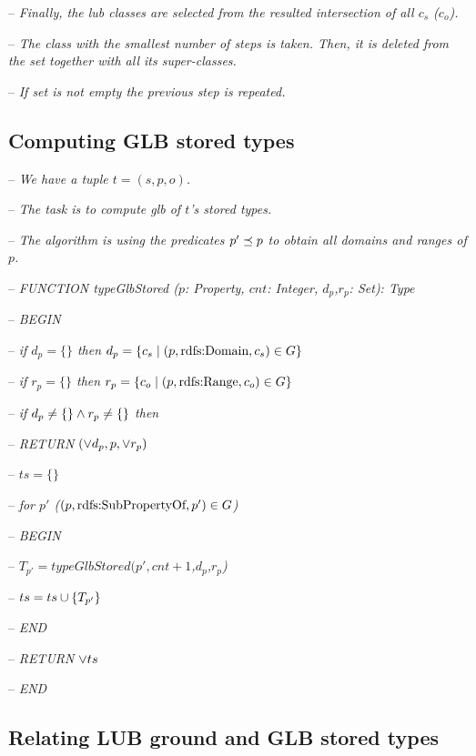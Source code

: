 \documentclass[runningheads]{llncs}
\newcommand{\notes}[1]{\noindent\begin{small}-- \emph{#1}\\\end{small}}
\begin{document}
\notes{Finally, the lub classes are selected from the resulted intersection of all $c_s$ ($c_o$).}
\notes{The class with the smallest number of steps is taken. Then, it is deleted from the set together with all its super-classes.}
\notes{If set is not empty the previous step is repeated.}

\subsection{Computing GLB stored types}


\notes{We have a tuple $t=(s,p,o)$.}
\notes{The task is to compute glb of $t$'s stored types.}
\notes{The algorithm is using the predicates $p'\preceq\/p$ to obtain all domains and ranges of $p$.}



\notes{FUNCTION typeGlbStored ($p$: Property, $cnt$: Integer, $d_p$,$r_p$: Set): Type}
\notes{BEGIN}
\notes{if $d_p=\{\}$ then $d_p =  \{ c_s \mid (p,\text{rdfs:Domain},c_s)\in\/G\}$}
\notes{if $r_p=\{\}$ then $r_p =  \{ c_o \mid (p,\text{rdfs:Range},c_o)\in\/G\}$}
\notes{if $d_p\not=\{\}\land\/r_p\not=\{\}$ then }
\notes{RETURN $(\lor\/d_p,p,\lor\/r_p)$}
\notes{$ts = \{\}$}
\notes{for $p'$ ($(p,\text{rdfs:SubPropertyOf},p')\in\/G$)}
\notes{BEGIN}
\notes{$T_{p'} = typeGlbStored(p',cnt+1$,$d_p$,$r_p$)}
\notes{$ts = ts\cup\/\{T_{p'}\}$}
\notes{END}
\notes{RETURN $\lor\/ts$}
\notes{END}







\subsection{Relating LUB ground and GLB stored types}
\end{document}
